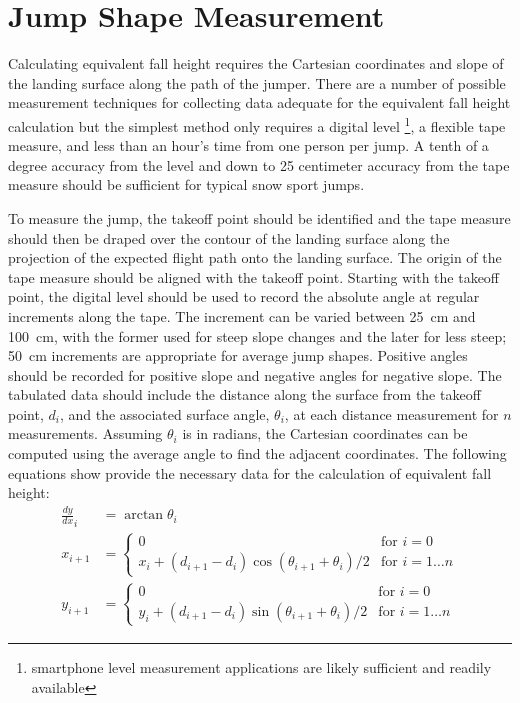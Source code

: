 \documentclass[smallextended]{svjour3}       %
\begin{document}
\section{Jump Shape Measurement}
\label{sec:jump-shape-measurement}
%
Calculating equivalent fall height requires the Cartesian coordinates and slope
of the landing surface along the path of the jumper. There are a number of
possible measurement techniques for collecting data adequate for the equivalent
fall height calculation but the simplest method only requires a digital level
\footnote{smartphone level measurement applications are likely sufficient and
readily available}, a flexible tape measure, and less than an hour's time from
one person per jump. A tenth of a degree accuracy from the level and down to 25
centimeter accuracy from the tape measure should be sufficient for typical snow
sport jumps.

To measure the jump, the takeoff point should be identified and the tape
measure should then be draped over the contour of the landing surface along the
projection of the expected flight path onto the landing surface. The origin of
the tape measure should be aligned with the takeoff point. Starting with the
takeoff point, the digital level should be used to record the absolute angle at
regular increments along the tape. The increment can be varied between
25~\si{\centi\meter} and 100~\si{\centi\meter}, with the former used for steep
slope changes and the later for less steep; 50~\si{\centi\meter} increments are
appropriate for average jump shapes. Positive angles should be recorded for
positive slope and negative angles for negative slope. The tabulated data
should include the distance along the surface from the takeoff point, $d_i$,
and the associated surface angle, $\theta_i$, at each distance measurement for
$n$ measurements. Assuming $\theta_i$ is in radians, the Cartesian coordinates
can be computed using the average angle to find the adjacent coordinates. The
following equations show provide the necessary data for the calculation of
equivalent fall height:
%
\begin{align}
  \frac{dy}{dx}_{i} & = \arctan{\theta_i} \\
  x_{i + 1} & =
  \begin{cases}
    0 & \text{for } i=0 \\
    x_i + (d_{i+1} - d_i)\cos{(\theta_{i+1} + \theta_i)/2} &  \text{for } i=1\ldots n
  \end{cases} \\
  y_{i + 1} & =
  \begin{cases}
    0 & \text{for } i=0 \\
    y_i + (d_{i+1} - d_i)\sin{(\theta_{i+1} + \theta_i)/2} &  \text{for } i=1\ldots n
  \end{cases}
\end{align}
\end{document}
